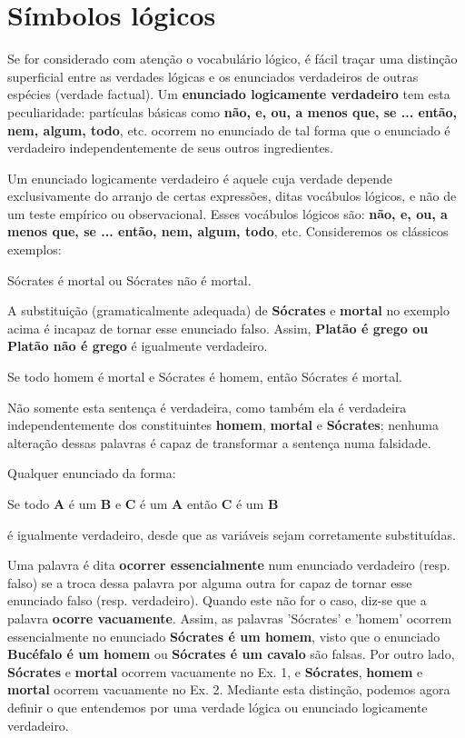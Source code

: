\newpage

\section{Símbolos lógicos}

Se for considerado com atenção o vocabulário lógico, é fácil traçar uma distinção superficial entre as verdades lógicas e os enunciados verdadeiros de outras espécies (verdade factual).
Um \textbf{enunciado logicamente verdadeiro} tem esta peculiaridade: partículas básicas como \textbf{não, e, ou, a menos que, se ... então, nem, algum, todo}, etc. ocorrem no enunciado de tal forma que o enunciado é verdadeiro independentemente de seus outros ingredientes.

Um enunciado logicamente verdadeiro é aquele cuja verdade depende exclusivamente do arranjo de certas expressões, ditas vocábulos lógicos, e não de um teste empírico ou observacional.
Esses vocábulos lógicos são: \textbf{não, e, ou, a menos que, se ... então, nem, algum, todo}, etc.
Consideremos os clássicos exemplos:

\bigskip
\begin{exemplo} Sócrates é mortal ou Sócrates não é mortal.
\end{exemplo}

\bigskip
\noindent
A substituição (gramaticalmente adequada) de \textbf{Sócrates} e \textbf{mortal} no exemplo acima é incapaz de tornar esse enunciado falso.
Assim, \textbf{Platão é grego ou Platão não é grego} é igualmente verdadeiro.

\bigskip
\begin{exemplo} Se todo homem é mortal e Sócrates é homem, então Sócrates é mortal.
\end{exemplo}

\bigskip
\noindent
Não somente esta sentença é verdadeira, como também ela é verdadeira independentemente dos constituintes \textbf{homem}, \textbf{mortal} e \textbf{Sócrates}; nenhuma alteração dessas palavras é capaz de transformar a sentença numa falsidade.
\newpage

\noindent Qualquer enunciado da forma:

Se todo \textbf{A} é um \textbf{B} e \textbf{C} é um \textbf{A} então \textbf{C} é um \textbf{B}

\noindent é igualmente verdadeiro, desde que as variáveis sejam corretamente substituídas.

Uma palavra é dita \textbf{ocorrer essencialmente} num enunciado verdadeiro (resp. falso) se a troca dessa palavra por alguma outra for capaz de tornar esse enunciado falso (resp. verdadeiro).
Quando este não for o caso, diz-se que a palavra \textbf{ocorre vacuamente}.
Assim, as palavras 'Sócrates' e 'homem' ocorrem essencialmente no enunciado \textbf{Sócrates é um homem}, visto que o enunciado \textbf{Bucéfalo é um homem} ou \textbf{Sócrates é um cavalo} são falsas.
Por outro lado, \textbf{Sócrates} e \textbf{mortal} ocorrem vacuamente no Ex. 1, e \textbf{Sócrates}, \textbf{homem} e \textbf{mortal} ocorrem vacuamente no Ex. 2.
Mediante esta distinção, podemos agora definir o que entendemos por uma verdade lógica ou enunciado logicamente verdadeiro.

